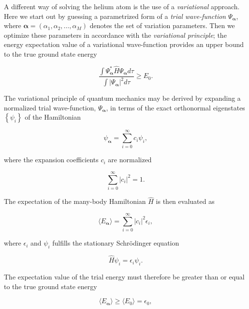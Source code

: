 A different way of solving the helium atom is the use of a
\emph{variational} approach. Here we start out by guessing a
parametrized form of a \emph{trial wave-function}
$\Psi_{\mathbf{\alpha}}$, where  
$\mathbf{\alpha} = (\alpha_1, \alpha_2,\dots,\alpha_M)$  
denotes the set of variation parameters. Then we optimize these
parameters in accordance with the 
\emph{variational principle}; the energy expectation value of a
variational wave-function provides an upper bound to the true ground
state energy

\begin{equation*} 
  \frac{\int \Psi_{\mathbf{\alpha}}^* \hat{H}
  \Psi_{\mathbf{\alpha}} d\tau}{\int \vert
  \Psi_{\mathbf{\alpha}}\vert^2 d\tau} \ge E_0.
\end{equation*}

The variational principle of quantum mechanics may be derived by
expanding a normalized trial wave-function, $\Psi_{\mathbf{\alpha}}$,
in terms of the exact orthonormal eigenstates $\left\{ \psi_i
\right\}$ of the Hamiltonian

\begin{equation*} 
  \psi_{\mathbf{\alpha}}=\sum_{i=0}^{\infty} c_{i} \psi_i,
\end{equation*}

where the expansion coefficients $c_{i}$ are normalized

\begin{equation*} 
  \sum_{i=0}^{\infty} \vert c_{i}\vert^2=1. 
\end{equation*}

The expectation of the many-body Hamiltonian $\hat{H}$ is
then evaluated as

\begin{equation*} 
  \langle E_{\mathbf{\alpha}} \rangle =  
 \sum_{i=0}^{\infty} \vert c_{i}\vert^{2} \epsilon_{i},
\end{equation*}

where $\epsilon_{i}$ and $\psi_i $ fulfills the stationary
Schr\"odinger equation

\begin{equation*} 
  \hat{H} \psi_i = \epsilon_{i} \psi_i.
\end{equation*}

The expectation value of the trial energy
must therefore be greater than or equal to the true ground state
energy

\begin{equation*} 
  \langle E_{\mathbf{\alpha}} \rangle \ge \langle E_0 \rangle = \epsilon_0,
\end{equation*}

